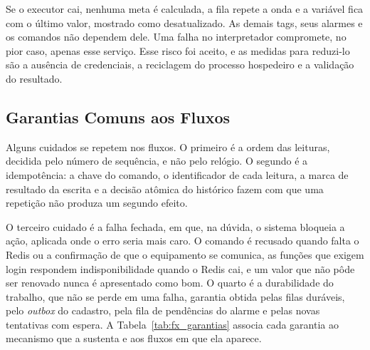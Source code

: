 \par Se o executor cai, nenhuma meta é calculada, a fila repete a onda e a variável fica com o último valor, mostrado como desatualizado. As demais tags, seus alarmes e os comandos não dependem dele. Uma falha no interpretador compromete, no pior caso, apenas esse serviço. Esse risco foi aceito, e as medidas para reduzi-lo são a ausência de credenciais, a reciclagem do processo hospedeiro e a validação do resultado.

\subsection{Garantias Comuns aos Fluxos}

\par Alguns cuidados se repetem nos fluxos. O primeiro é a ordem das leituras, decidida pelo número de sequência, e não pelo relógio. O segundo é a idempotência: a chave do comando, o identificador de cada leitura, a marca de resultado da escrita e a decisão atômica do histórico fazem com que uma repetição não produza um segundo efeito.

\par O terceiro cuidado é a falha fechada, em que, na dúvida, o sistema bloqueia a ação, aplicada onde o erro seria mais caro. O comando é recusado quando falta o Redis ou a confirmação de que o equipamento se comunica, as funções que exigem login respondem indisponibilidade quando o Redis cai, e um valor que não pôde ser renovado nunca é apresentado como bom. O quarto é a durabilidade do trabalho, que não se perde em uma falha, garantia obtida pelas filas duráveis, pelo \emph{outbox} do cadastro, pela fila de pendências do alarme e pelas novas tentativas com espera. A Tabela~\ref{tab:fx_garantias} associa cada garantia ao mecanismo que a sustenta e aos fluxos em que ela aparece.

